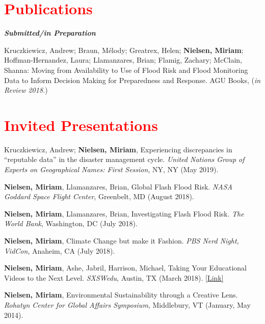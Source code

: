 \documentclass[margin, line, palatino, courier, 10pt]{res}
\begin{document}
\begin{resume}
\begin{tabular}{@{}p{1 in}p{4in}}
\end{tabular}



\section{\sc \large{\textcolor{Red}{Publications}}}

\textit{\textbf{Submitted/in Preparation}}
\vspace*{-0.1in}\\
\begin{etaremune}[leftmargin=.2in,topsep=0in,parsep=0in]
\item Kruczkiewicz, Andrew; Braun, Mélody; Greatrex, Helen; \textbf{Nielsen, Miriam}; Hoffman-Hernandez, Laura; Llamanzares, Brian; Flamig, Zachary; McClain, Shanna: Moving from Availability to Use of Flood Risk and Flood Monitoring Data to Inform Decision Making for Preparedness and Response. AGU Books, (\textit{in Review 2018.})
\end{etaremune}

\section{\sc \textcolor{Red}{\large{Invited Presentations}}}
\begin{etaremune}[leftmargin=.2in,topsep=0in,parsep=0in]
\item  Kruczkiewicz, Andrew; \textbf{Nielsen, Miriam},  Experiencing discrepancies in “reputable data” in the disaster management cycle. \textit{United Nations Group of Experts on Geographical Names: First Session}, NY, NY (May 2019). 
\item  \textbf{Nielsen, Miriam}, Llamanzares, Brian, Global Flash Flood Risk. \textit{NASA Goddard Space Flight Center}, Greenbelt, MD (August 2018). 
\item  \textbf{Nielsen, Miriam}, Llamanzares, Brian, Investigating Flash Flood Risk. \textit{The World Bank}, Washington, DC (July 2018). 
\item  \textbf{Nielsen, Miriam}, Climate Change but make it Fashion. \textit{PBS Nerd Night, VidCon}, Anaheim, CA (July 2018).
\item  \textbf{Nielsen, Miriam}, Ashe, Jabril, Harrison, Michael, Taking Your Educational Videos to the Next Level. \textit{SXSWedu}, Austin, TX (March 2018). \href{https://schedule.sxswedu.com/2018/events/PP76461"}{[Link]}
\item  \textbf{Nielsen, Miriam}, Environmental Sustainability through a Creative Lens. \textit{Rohatyn Center for Global Affairs Symposium}, Middlebury, VT (January, May 2014). 
\end{etaremune}




\end{resume}
\end{document}
